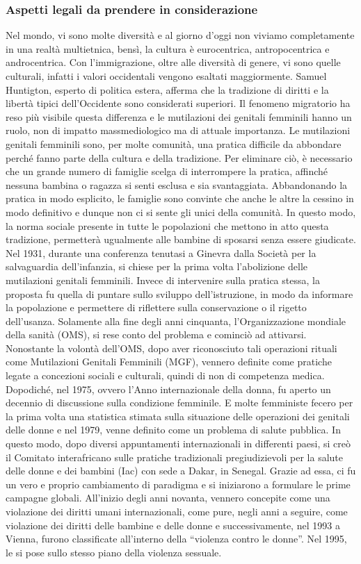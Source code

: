 \subsubsection{Aspetti legali da prendere in considerazione}

Nel mondo, vi sono molte diversità e al giorno d’oggi non viviamo completamente in una realtà multietnica, bensì, la cultura è eurocentrica, antropocentrica e androcentrica. Con l’immigrazione, oltre alle diversità di genere, vi sono quelle culturali, infatti i valori occidentali vengono esaltati maggiormente. Samuel Huntigton, esperto di politica estera, afferma che la tradizione di diritti e la libertà tipici dell’Occidente sono considerati superiori. Il fenomeno migratorio ha reso più visibile questa differenza e le mutilazioni dei genitali femminili hanno un ruolo, non di impatto massmediologico ma di attuale importanza.
Le mutilazioni genitali femminili sono, per molte comunità, una pratica difficile da abbondare perché fanno parte della cultura e della tradizione. Per eliminare ciò, è necessario che un grande numero di famiglie scelga di interrompere la pratica, affinché nessuna bambina o ragazza si senti esclusa e sia svantaggiata. Abbandonando la pratica in modo esplicito, le famiglie sono convinte che anche le altre la cessino in modo definitivo e dunque non ci si sente gli unici della comunità. In questo modo, la norma sociale presente in tutte le popolazioni che mettono in atto questa tradizione, permetterà ugualmente alle bambine di sposarsi senza essere giudicate. 
Nel 1931, durante una conferenza tenutasi a Ginevra dalla Società per la salvaguardia dell’infanzia, si chiese per la prima volta l’abolizione delle mutilazioni genitali femminili. Invece di intervenire sulla pratica stessa, la proposta fu quella di puntare sullo sviluppo dell’istruzione, in modo da informare la popolazione e permettere di riflettere sulla conservazione o il rigetto dell’usanza. 
Solamente alla fine degli anni cinquanta, l’Organizzazione mondiale della sanità (OMS), si rese conto del problema e cominciò ad attivarsi. Nonostante la volontà dell’OMS, dopo aver riconosciuto tali operazioni rituali come Mutilazioni Genitali Femminili (MGF), vennero definite come pratiche legate a concezioni sociali e culturali, quindi di non di competenza medica. Dopodiché, nel 1975, ovvero l’Anno internazionale della donna, fu aperto un decennio di discussione sulla condizione femminile. E molte femministe fecero per la prima volta una statistica stimata sulla situazione delle operazioni dei genitali delle donne e nel 1979, venne definito come un problema di salute pubblica. In questo modo, dopo diversi appuntamenti internazionali in differenti paesi, si creò il Comitato interafricano sulle pratiche tradizionali pregiudizievoli per la salute delle donne e dei bambini (Iac) con sede a Dakar, in Senegal. Grazie ad essa, ci fu un vero e proprio cambiamento di paradigma e si iniziarono a formulare le prime campagne globali. All’inizio degli anni novanta, vennero concepite come una violazione dei diritti umani internazionali, come pure, negli anni a seguire, come violazione dei diritti delle bambine e delle donne e successivamente, nel 1993 a Vienna, furono classificate all’interno della “violenza contro le donne”. Nel 1995, le si pose sullo stesso piano della violenza sessuale. 

